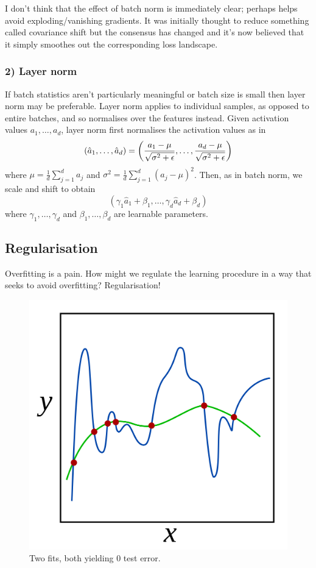 \documentclass[11pt]{article}
\begin{document}
I don't think that the effect of batch norm is immediately clear; perhaps helps avoid exploding/vanishing gradients. It was initially thought to reduce something called covariance shift but the consensus has changed and it's now believed that it simply smoothes out the corresponding loss landscape.

\subsubsection*{2) Layer norm}
If batch statistics aren't particularly meaningful or batch size is small then layer norm may be preferable. Layer norm applies to individual samples, as opposed to entire batches, and so normalises over the features instead. Given activation values $a_1,\dots,a_d$, layer norm first normalises the activation values as in
$$
(\hat{a}_1,\dots,\hat{a}_d)
=
\left(\frac{a_1-\mu}{\sqrt{\sigma^2+\epsilon}},\dots,\frac{a_d-\mu}{\sqrt{\sigma^2+\epsilon}}\right)
$$
where $\mu=\frac{1}{d}\sum_{j=1}^da_j$ and $\sigma^2=\frac{1}{d}\sum_{j=1}^d(a_j-\mu)^2$. Then, as in batch norm, we scale and shift to obtain
$$
(\gamma_1\hat{a}_1+\beta_1,\dots,\gamma_d\hat{a}_d+\beta_d)
$$
where $\gamma_1,\dots,\gamma_d$ and $\beta_1,\dots,\beta_d$ are learnable parameters.

\subsection{Regularisation}
Overfitting is a pain. How might we regulate the learning procedure in a way that seeks to avoid overfitting? Regularisation!

\begin{figure}[t]
    \centering
    \includegraphics[width=0.5\columnwidth]{./figures/supervised_learning/regularisation_two_plots_zero_test_error.png}
    \caption{Two fits, both yielding 0 test error. }
    \label{fig:regularisation_two_plots}
\end{figure}
\end{document}
